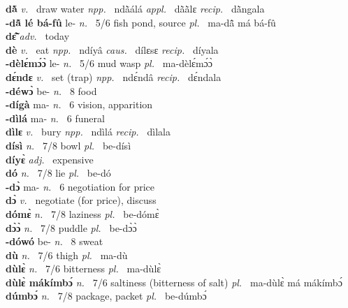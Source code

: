 \noindent
{\bfseries dã̀}  {\itshape v.~} draw water   {\itshape npp.~} ndã̀álá {\itshape appl.~} dã̀ã̀lɛ {\itshape recip.~} dã̀ngala  \\ 
{\bfseries -dã̂ lé bá-fû} le- {\itshape n.~} 5/6 fish pond, source {\itshape pl.~} ma-dã̂ má bá-fû    \\ 
{\bfseries dɛ̃̂}  {\itshape adv.~} today    \\ 
{\bfseries dè}  {\itshape v.~} eat   {\itshape npp.~} ndíyâ {\itshape caus.~} dílɛsɛ {\itshape recip.~} díyala  \\ 
{\bfseries -dèlɛ́mɔ́ɔ̀} le- {\itshape n.~} 5/6 mud wasp {\itshape pl.~} ma-dèlɛ́mɔ́ɔ̀    \\ 
{\bfseries dɛ́ndɛ}  {\itshape v.~} set (trap)   {\itshape npp.~} ndɛ́ndâ {\itshape recip.~} dɛ́ndala  \\ 
{\bfseries -déwɔ̀} be- {\itshape n.~} 8 food    \\ 
{\bfseries -dígà} ma- {\itshape n.~} 6 vision, apparition    \\ 
{\bfseries -dìlá} ma- {\itshape n.~} 6 funeral    \\ 
{\bfseries dìlɛ}  {\itshape v.~} bury   {\itshape npp.~} ndìlá {\itshape recip.~} dìlala  \\ 
{\bfseries dísì}  {\itshape n.~} 7/8 bowl {\itshape pl.~} be-dísì    \\ 
{\bfseries díyɛ̀}  {\itshape adj.~} expensive    \\ 
{\bfseries dó}  {\itshape n.~} 7/8 lie {\itshape pl.~} be-dó    \\ 
{\bfseries -dɔ̀} ma- {\itshape n.~} 6 negotiation for price    \\ 
{\bfseries dɔ̀}  {\itshape v.~} negotiate (for price), discuss    \\ 
{\bfseries dómɛ̀}  {\itshape n.~} 7/8 laziness {\itshape pl.~} be-dómɛ̀   \\ 
{\bfseries dɔ̀ɔ̀}  {\itshape n.~} 7/8 puddle {\itshape pl.~} be-dɔ̀ɔ̀    \\ 
{\bfseries -dówó} be- {\itshape n.~} 8 sweat    \\ 
{\bfseries dù}  {\itshape n.~} 7/6 thigh {\itshape pl.~} ma-dù    \\ 
{\bfseries dùlɛ̀}  {\itshape n.~} 7/6 bitterness {\itshape pl.~} ma-dùlɛ̀    \\ 
{\bfseries dùlɛ̀ mákímbɔ́}  {\itshape n.~} 7/6 saltiness (bitterness of salt) {\itshape pl.~} ma-dùlɛ̀ má mákímbɔ́   \\ 
{\bfseries dúmbɔ́}  {\itshape n.~} 7/8 package, packet {\itshape pl.~} be-dúmbɔ́    \\ 
